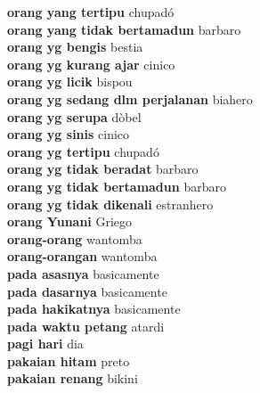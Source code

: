 \textbf{ orang yang tertipu  } chupadó \\
\textbf{ orang yang tidak bertamadun  } barbaro \\
\textbf{ orang yg bengis  } bestia \\
\textbf{ orang yg kurang ajar  } cinico \\
\textbf{ orang yg licik  } bispou \\
\textbf{ orang yg sedang dlm perjalanan  } biahero \\
\textbf{ orang yg serupa  } dòbel \\
\textbf{ orang yg sinis  } cinico \\
\textbf{ orang yg tertipu  } chupadó \\
\textbf{ orang yg tidak beradat  } barbaro \\
\textbf{ orang yg tidak bertamadun  } barbaro \\
\textbf{ orang yg tidak dikenali  } estranhero \\
\textbf{ orang Yunani  } Griego \\
\textbf{ orang-orang  } wantomba \\
\textbf{ orang-orangan  } wantomba \\
\textbf{ pada asasnya  } basicamente \\
\textbf{ pada dasarnya  } basicamente \\
\textbf{ pada hakikatnya  } basicamente \\
\textbf{ pada waktu petang  } atardi \\
\textbf{ pagi hari  } dia \\
\textbf{ pakaian hitam  } preto \\
\textbf{ pakaian renang  } bikini \\
